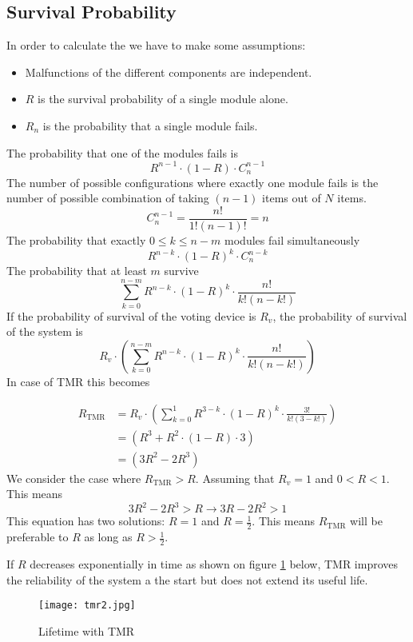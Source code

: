 \documentclass[../main.tex]{subfiles}
\begin{document}
\subsection{Survival Probability}
In order to calculate the  we have to make some assumptions:
\begin{itemize}
	\item Malfunctions of the different components are independent.
	\item $R$ is the survival probability of a single module alone.
	\item $R_n$ is the probability that a single module fails.
\end{itemize}
The probability that one of the modules fails is
\[
R^{n-1} \cdot (1 - R) \cdot C^{n-1}_{n}
\]
The number of possible configurations where exactly one module fails is the number of possible combination of taking $(n-1)$ items out of $N$ items.
\[
C^{n-1}_{n} = \frac{n!}{1!(n-1)!} = n
\]
The probability that exactly $0 \leq k \leq n-m$ modules fail simultaneously 
\[
R^{n-k} \cdot (1 - R)^k \cdot C^{n-k}_{n}
\]
The probability that at least $m$ survive
\[
\sum^{n-m}_{k=0} R^{n-k} \cdot (1 - R)^k \cdot \frac{n!}{k!(n-k!)}
\]
If the probability of survival of the voting device is $R_v$, the probability of survival of the system is
\[
R_v \cdot \left( \sum^{n-m}_{k=0} R^{n-k} \cdot (1 - R)^k \cdot \frac{n!}{k!(n-k!)} \right)
\]
In case of TMR this becomes

\begin{align*}
R_\text{TMR} & = R_v \cdot \left( \sum^{1}_{k=0} R^{3-k} \cdot (1 - R)^k \cdot \frac{3!}{k!(3-k!)} \right) \\
& = \left( R^3 + R^2 \cdot (1-R) \cdot 3 \right) \\
& = \left( 3R^2 - 2R^3 \right)
\end{align*}
We consider the case where $R_{\text{TMR}} > R$. Assuming that $R_v = 1$ and $0 < R < 1$. This means
\[
3R^2 - 2R^3 > R \rightarrow 3R-2R^2 > 1
\]
This equation has two solutions: $R = 1$ and $R = \frac{1}{2}$. This means $R_{\text{TMR}}$ will be preferable to $R$ as long as $R > \frac{1}{2}$. 

\begin{exmp}
	If $R$ decreases exponentially in time as shown on figure \ref{tmr2} below, TMR improves the reliability of the system a the start but does not extend its useful life.
\begin{figure}[H]
    \centering
    \texttt{[image: tmr2.jpg]}
    \caption{Lifetime with TMR}
    \label{tmr2}
\end{figure}
\end{exmp}
\end{document}
